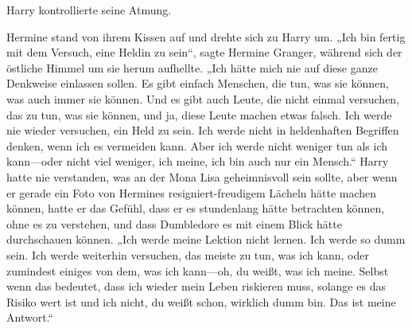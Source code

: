Harry kontrollierte seine Atmung.

Hermine stand von ihrem Kissen auf und drehte sich zu Harry um.
„Ich bin fertig mit dem Versuch, eine Heldin zu sein“, sagte Hermine Granger, während sich der östliche Himmel um sie herum aufhellte.
„Ich hätte mich nie auf diese ganze Denkweise einlassen sollen. Es gibt einfach Menschen, die tun, was sie können, was auch immer sie können. Und es gibt auch Leute, die nicht einmal versuchen, das zu tun, was sie können, und ja, diese Leute machen etwas falsch. Ich werde nie wieder versuchen, ein Held zu sein. Ich werde nicht in heldenhaften Begriffen denken, wenn ich es vermeiden kann. Aber ich werde nicht weniger tun als ich kann—oder nicht viel weniger, ich meine, ich bin auch nur ein Mensch.“
Harry hatte nie verstanden, was an der Mona Lisa geheimnisvoll sein sollte, aber wenn er gerade ein Foto von Hermines resigniert-freudigem Lächeln hätte machen können, hatte er das Gefühl, dass er es stundenlang hätte betrachten können, ohne es zu verstehen, und dass Dumbledore es mit einem Blick hätte durchschauen können.
„Ich werde meine Lektion nicht lernen. Ich werde so dumm sein. Ich werde weiterhin versuchen, das meiste zu tun, was ich kann, oder zumindest einiges von dem, was ich kann—oh, du weißt, was ich meine. Selbst wenn das bedeutet, dass ich wieder mein Leben riskieren muss, solange es das Risiko wert ist und ich nicht, du weißt schon, wirklich dumm bin. Das ist meine Antwort.“

